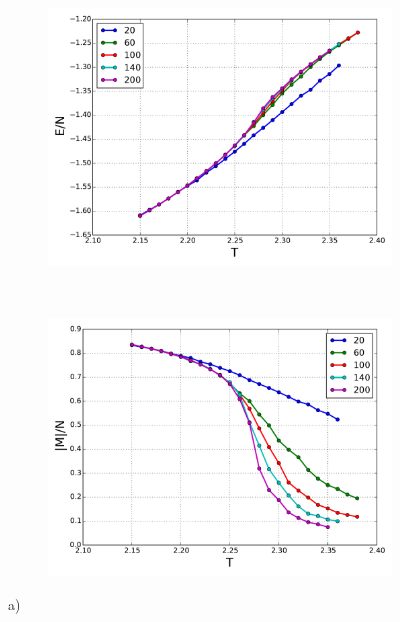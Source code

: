 \begin{figure}[H]
    \centering
    \begin{subfigure}{0.5\textwidth}
        \centering
        \includegraphics[width=\linewidth]{result/bilder/Tc/e-Tc}
        \caption{}
    \end{subfigure}%
    ~ 
    \begin{subfigure}{0.5\textwidth}
        \centering
        \includegraphics[width=\linewidth]{result/bilder/Tc/m-Tc}
        \caption{}
    \end{subfigure}
    \caption{a) }
    \label{fig:tc-E-M}
\end{figure}












